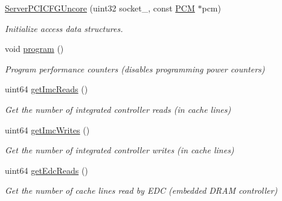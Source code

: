\begin{DoxyCompactItemize}
\item 
\mbox{\hyperlink{class_server_p_c_i_c_f_g_uncore_a4e4176c31a041902805e16cc452016d3}{Server\+P\+C\+I\+C\+F\+G\+Uncore}} (uint32 socket\+\_\+, const \mbox{\hyperlink{class_p_c_m}{P\+CM}} $\ast$pcm)
\begin{DoxyCompactList}\small\item\em Initialize access data structures. \end{DoxyCompactList}\item 
\mbox{\label{class_server_p_c_i_c_f_g_uncore_acd6e859dd5eaaadf97d2c59ae70ac4a7}} 
void \mbox{\hyperlink{class_server_p_c_i_c_f_g_uncore_acd6e859dd5eaaadf97d2c59ae70ac4a7}{program}} ()
\begin{DoxyCompactList}\small\item\em Program performance counters (disables programming power counters) \end{DoxyCompactList}\item 
\mbox{\label{class_server_p_c_i_c_f_g_uncore_a214de12b52f2d5a7c9c33701dfc8eb85}} 
uint64 \mbox{\hyperlink{class_server_p_c_i_c_f_g_uncore_a214de12b52f2d5a7c9c33701dfc8eb85}{get\+Imc\+Reads}} ()
\begin{DoxyCompactList}\small\item\em Get the number of integrated controller reads (in cache lines) \end{DoxyCompactList}\item 
\mbox{\label{class_server_p_c_i_c_f_g_uncore_a089f11fc46ab836884cc31b5b4ac08e3}} 
uint64 \mbox{\hyperlink{class_server_p_c_i_c_f_g_uncore_a089f11fc46ab836884cc31b5b4ac08e3}{get\+Imc\+Writes}} ()
\begin{DoxyCompactList}\small\item\em Get the number of integrated controller writes (in cache lines) \end{DoxyCompactList}\item 
\mbox{\label{class_server_p_c_i_c_f_g_uncore_a7a1fdecee105080d104bc7763d2fc06a}} 
uint64 \mbox{\hyperlink{class_server_p_c_i_c_f_g_uncore_a7a1fdecee105080d104bc7763d2fc06a}{get\+Edc\+Reads}} ()
\begin{DoxyCompactList}\small\item\em Get the number of cache lines read by E\+DC (embedded D\+R\+AM controller) \end{DoxyCompactList}\item 

\end{DoxyCompactItemize}

